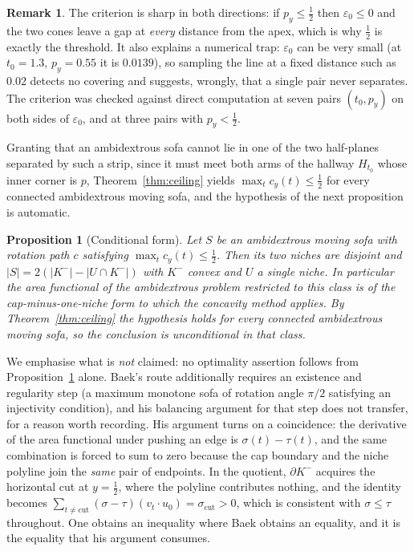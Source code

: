 \documentclass[11pt]{article}
\newtheorem{proposition}[theorem]{Proposition}
\theoremstyle{definition}
\newtheorem{remark}[theorem]{Remark}
\begin{document}
\begin{remark}
The criterion is sharp in both directions: if $p_y\le\tfrac12$ then
$\varepsilon_0\le0$ and the two cones leave a gap at \emph{every} distance from the
apex, which is why $\tfrac12$ is exactly the threshold. It also explains a
numerical trap: $\varepsilon_0$ can be very small (at $t_0=1.3$, $p_y=0.55$ it is
$0.0139$), so sampling the line at a fixed distance such as $0.02$ detects no
covering and suggests, wrongly, that a single pair never separates. The criterion
was checked against direct computation at seven pairs $(t_0,p_y)$ on both sides of
$\varepsilon_0$, and at three pairs with $p_y<\tfrac12$.
\end{remark}

Granting that an ambidextrous sofa cannot lie in one of the two half-planes
separated by such a strip, since it must meet both arms of the hallway
$H_{t_0}$ whose inner corner is $p$, Theorem~\ref{thm:ceiling} yields
$\max_t c_y(t)\le\tfrac12$ for every connected ambidextrous moving sofa, and the
hypothesis of the next proposition is automatic.

\begin{proposition}[Conditional form]\label{prop:cond}
Let $S$ be an ambidextrous moving sofa with rotation path $c$ satisfying
$\max_t c_y(t)\le\tfrac12$. Then its two niches are disjoint and
$|S|=2(|K^-|-|U\cap K^-|)$ with $K^-$ convex and $U$ a single niche. In
particular the area functional of the ambidextrous problem restricted to this
class is of the cap-minus-one-niche form to which the concavity method applies.
By Theorem~\ref{thm:ceiling} the hypothesis holds for every connected
ambidextrous moving sofa, so the conclusion is unconditional in that class.
\end{proposition}

We emphasise what is \emph{not} claimed: no optimality assertion follows from
Proposition~\ref{prop:cond} alone. Baek's route additionally requires an
existence and regularity step (a maximum monotone sofa of rotation angle $\pi/2$
satisfying an injectivity condition), and his balancing argument for that step
does not transfer, for a reason worth recording. His argument turns on a
coincidence: the derivative of the area functional under pushing an edge is
$\sigma(t)-\tau(t)$, and the same combination is forced to sum to zero because
the cap boundary and the niche polyline join the \emph{same} pair of endpoints.
In the quotient, $\partial K^-$ acquires the horizontal cut at $y=\tfrac12$,
where the polyline contributes nothing, and the identity becomes
$\sum_{t\ne\mathrm{cut}}(\sigma-\tau)(v_t\cdot u_0)=\sigma_{\mathrm{cut}}>0$,
which is consistent with $\sigma\le\tau$ throughout. One obtains an inequality
where Baek obtains an equality, and it is the equality that his argument
consumes.
\end{document}
